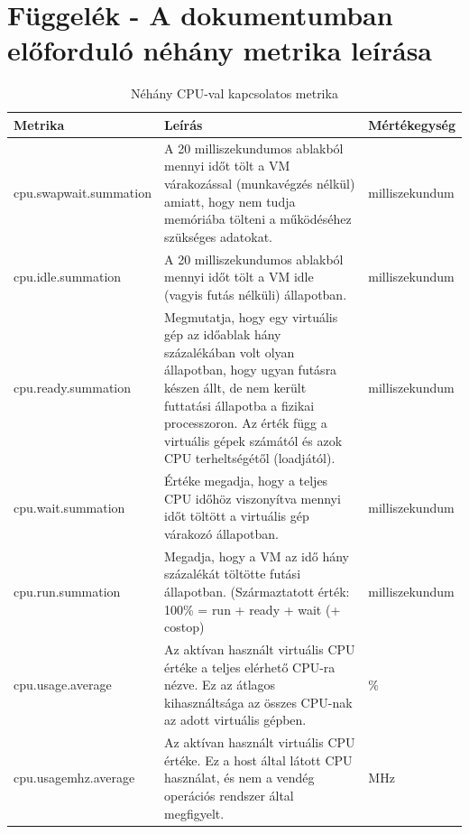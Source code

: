 \documentclass[a4paper,10pt,titlepage]{article}
\begin{document}
\section{Függelék - A dokumentumban előforduló néhány metrika leírása}
\begin{table}[ht]
	\caption{Néhány CPU-val kapcsolatos metrika}
	\centering
	\small
	\begin{tabular}{| p{3.5cm} | p{7.5cm} | p{2cm} |}
		\hline
		\rowcolor{tc_bone} \textbf{Metrika} & \textbf{Leírás} & \textbf{Mértékegység} \\
		\hline
		cpu.swapwait.summation & A 20 milliszekundumos ablakból mennyi időt tölt a VM várakozással (munkavégzés nélkül) amiatt, hogy nem tudja memóriába tölteni a működéséhez szükséges adatokat. & milliszekundum \\ 
		\hline
		cpu.idle.summation & A 20 milliszekundumos ablakból mennyi időt tölt a VM idle (vagyis futás nélküli) állapotban. & milliszekundum \\ 
		\hline
		cpu.ready.summation & Megmutatja, hogy egy virtuális gép az időablak hány százalékában volt olyan állapotban, hogy ugyan futásra készen állt, de nem került futtatási állapotba a fizikai processzoron. Az érték függ a virtuális gépek számától és azok CPU terheltségétől (loadjától). & milliszekundum \\ 
		\hline
		cpu.wait.summation & Értéke megadja, hogy a teljes CPU időhöz viszonyítva mennyi időt töltött a virtuális gép várakozó állapotban. & milliszekundum \\ 
		\hline
		cpu.run.summation & Megadja, hogy a VM az idő hány százalékát töltötte futási állapotban. (Származtatott érték: 100\% = run + ready + wait (+ costop) & milliszekundum \\ 
		\hline
		cpu.usage.average & Az aktívan használt virtuális CPU értéke a teljes elérhető CPU-ra nézve. Ez az átlagos kihasználtsága az összes CPU-nak az adott virtuális gépben. & \% \\ 
		\hline
		cpu.usagemhz.average & Az aktívan használt virtuális CPU értéke. Ez a host által látott CPU használat, és nem a vendég operációs rendszer által megfigyelt. & MHz \\ 
		\hline
	\end{tabular}
	\normalsize
	\label{tab:cpu.metrics}
\end{table}
\end{document}
